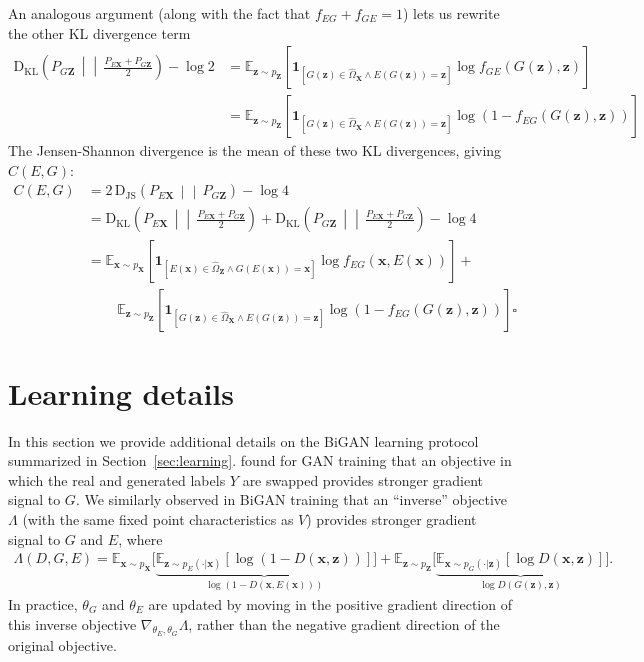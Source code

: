 \documentclass{article}
\newcommand{\expect}[2]{\mathbb{E}_{#1}\left[#2\right]}
\newcommand{\ldeltafunc}[1]{\mathbf{1}_{\left[#1\right]}}
\newcommand{\logp}[1]{\log\left(#1\right)}
\newcommand{\jsd}[2]{\mathrm{D_{JS}}\left(\left.#1\,\middle|\middle|\,#2\right.\right)}
\newcommand{\kld}[2]{\mathrm{D_{KL}}\left(\left.#1\,\middle|\middle|\,#2\right.\right)}
\renewcommand{\vec}[1]{\mathbf{#1}}
\newcommand{\x}{\vec{x}}
\newcommand{\X}{\vec{X}}
\newcommand{\hOX}{\hat{\Omega}_\X}
\newcommand{\z}{\vec{z}}
\newcommand{\Z}{\vec{Z}}
\newcommand{\hOZ}{\hat{\Omega}_\Z}
\newcommand{\refsec}[1]{Section~\ref{sec:#1}}
\newcommand{\lblsec}[1]{\label{sec:#1}}
\begin{document}
\begin{appendices}
An analogous argument
(along with the fact that $f_{EG} + f_{GE} = 1$) lets us rewrite the other KL divergence term
\begin{align*}
\kld{P_{G\Z}}{\tfrac{P_{E\X}+P_{G\Z}}{2}}
- \log 2
&= \expect{\z \sim p_\Z}{\ldeltafunc{G(\z) \in \hOX \land E(G(\z))=\z} \log f_{GE}(G(\z), \z)} \\
&= \expect{\z \sim p_\Z}{\ldeltafunc{G(\z) \in \hOX \land E(G(\z))=\z} \logp{ 1 - f_{EG}(G(\z), \z) }}
\end{align*}
The Jensen-Shannon divergence is the mean of these two KL divergences, giving $C(E, G)$:
\begin{align*}
  C(E, G)
  &= 2 \, \jsd{P_{E\X}}{P_{G\Z}} - \log 4
  \\
  &=
  \kld{P_{E\X}}{\tfrac{P_{E\X}+P_{G\Z}}{2}}
  +
  \kld{P_{G\Z}}{\tfrac{P_{E\X}+P_{G\Z}}{2}}
  - \log 4
  \\
  &=
  \expect{\x \sim p_\X}{\ldeltafunc{E(\x) \in \hOZ \land G(E(\x))=\x} \log f_{EG}(\x, E(\x))} + \\
  &\phantom{=} \; \; \;
  \expect{\z \sim p_\Z}{\ldeltafunc{G(\z) \in \hOX \land E(G(\z))=\z} \logp{ 1 - f_{EG}(G(\z), \z) }}
  \square
\end{align*}

\section{Learning details}
\lblsec{learning_details}
In this section we provide additional details on the BiGAN learning protocol summarized in \refsec{learning}.
\citet{gan} found for GAN training that
an objective in which the real and generated labels $Y$ are swapped
provides stronger gradient signal to $G$.
We similarly observed in BiGAN training that an ``inverse'' objective $\Lambda$
(with the same fixed point characteristics as $V$)
provides stronger gradient signal to $G$ and $E$, where
\begin{align*}
\Lambda(D, G, E)
=
\mathbb{E}_{\x \sim p_\X}\big[
  \underbrace{
    \expect{\z \sim p_E(\cdot | \x)}{
      \logp{1 - D(\x, \z)}
    }
  }_{
    \logp{1 - D(\x, E(\x))}
  }
\big]
+
\mathbb{E}_{\z \sim p_\Z}\big[
  \underbrace{
    \expect{\x \sim p_G(\cdot | \z)}{
      \log D(\x, \z)
    }
  }_{
    \log D(G(\z), \z)
  }
\big].
\end{align*}
In practice, $\theta_G$ and $\theta_E$ are updated by moving in the
positive gradient direction of this inverse objective $
\nabla_{\theta_E,\theta_G}
\Lambda
$,
rather than the negative gradient direction of the original objective.


\end{appendices}
\end{document}
